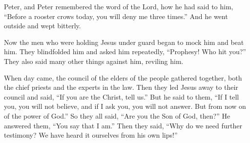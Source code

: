 {Peter,
and
Peter
remembered
the word
of the Lord,
how
he had said
to him,
“Before
a rooster
crows
today,
you will deny
me
three times.”
And
he went
outside
and wept
bitterly.
\par }{\PP {}Now
the men
who were holding
Jesus
under guard began to mock
him
and beat him.
They blindfolded
him
and asked
him repeatedly, “Prophesy! Who
hit
you?”
They
also
said
many
other things
against
him,
reviling him.
\par }{\PP {}When day
came,
the council of the elders
of the people
gathered together,
both
the chief priests
and
the experts in the law.
Then
they led
Jesus
away
to
their
council
and said, “If
you
are
the Christ,
tell
us.”
But
he said
to them,
“If
I tell
you,
you will not believe,
and
if
I ask
you, you will
not
answer.
But
from
now on
{}
of the power
of God.”
So
they
all
said,
“Are
you
the Son
of God,
then?” He answered
them,
“You
say
that
I
am.”
Then
they said,
“Why
do we need
further
testimony? We have heard
it ourselves
from
his own
lips!”

}
